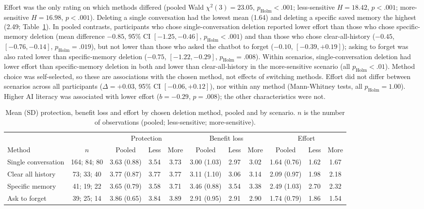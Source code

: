 \documentclass[conference,compsoc]{IEEEtran}
\begin{document}
Effort was the only rating on which methods differed (pooled Wald $\chi^2(3)=23.05$, $p_{\mathrm{Holm}}<.001$; less-sensitive $H=18.42$, $p<.001$; more-sensitive $H=16.98$, $p<.001$). Deleting a single conversation had the lowest mean (1.64) and deleting a specific saved memory the highest (2.49; Table~\ref{tab:method-scales}). In pooled contrasts, participants who chose single-conversation deletion reported lower effort than those who chose specific-memory deletion (mean difference $-0.85$, 95\% CI $[-1.25, -0.46]$, $p_{\mathrm{Holm}}<.001$) and than those who chose clear-all-history ($-0.45$, $[-0.76, -0.14]$, $p_{\mathrm{Holm}}=.019$), but not lower than those who asked the chatbot to forget ($-0.10$, $[-0.39, +0.19]$); asking to forget was also rated lower than specific-memory deletion ($-0.75$, $[-1.22, -0.29]$, $p_{\mathrm{Holm}}=.008$). Within scenarios, single-conversation deletion had lower effort than specific-memory deletion in both and lower than clear-all-history in the more-sensitive scenario (all $p_{\mathrm{Holm}}<.01$). Method choice was self-selected, so these are associations with the chosen method, not effects of switching methods. Effort did not differ between scenarios across all participants ($\Delta=+0.03$, 95\% CI $[-0.06, +0.12]$), nor within any method (Mann-Whitney tests, all $p_{\mathrm{Holm}}=1.00$). Higher AI literacy was associated with lower effort ($b=-0.29$, $p=.008$); the other characteristics were not.

\begin{table}[t]
\centering
\caption{Mean (SD) protection, benefit loss and effort by chosen deletion method, pooled and by scenario. $n$ is the number of observations (pooled; less-sensitive; more-sensitive).}
\label{tab:method-scales}
\small
\setlength{\tabcolsep}{4pt}
\begin{tabular}{lcccccccccc}
\toprule
 & & \multicolumn{3}{c}{Protection} & \multicolumn{3}{c}{Benefit loss} & \multicolumn{3}{c}{Effort} \\
\cmidrule(lr){3-5}\cmidrule(lr){6-8}\cmidrule(lr){9-11}
Method & $n$ & Pooled & Less & More & Pooled & Less & More & Pooled & Less & More \\
\midrule
Single conversation & 164; 84; 80 & 3.63 (0.88) & 3.54 & 3.73 & 3.00 (1.03) & 2.97 & 3.02 & 1.64 (0.76) & 1.62 & 1.67 \\
Clear all history & 73; 33; 40 & 3.77 (0.87) & 3.77 & 3.77 & 3.11 (1.10) & 3.06 & 3.14 & 2.09 (0.97) & 1.98 & 2.18 \\
Specific memory & 41; 19; 22 & 3.65 (0.79) & 3.58 & 3.71 & 3.46 (0.88) & 3.54 & 3.38 & 2.49 (1.03) & 2.70 & 2.32 \\
Ask to forget & 39; 25; 14 & 3.86 (0.65) & 3.84 & 3.89 & 2.91 (0.95) & 2.91 & 2.90 & 1.74 (0.79) & 1.86 & 1.54 \\
\bottomrule
\end{tabular}
\end{table}
\end{document}
